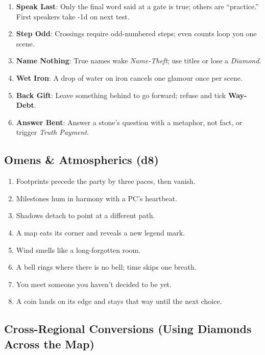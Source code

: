\begin{enumerate}
\item \textbf{Speak Last}: Only the final word said at a gate is true; others are “practice.” First speakers take -1d on next test.
\item \textbf{Step Odd}: Crossings require odd-numbered steps; even counts loop you one scene.
\item \textbf{Name Nothing}: True names wake \emph{Name-Theft}; use titles or lose a \emph{Diamond}.
\item \textbf{Wet Iron}: A drop of water on iron cancels one glamour once per scene.
\item \textbf{Back Gift}: Leave something behind to go forward; refuse and tick \textbf{Way-Debt}.
\item \textbf{Answer Bent}: Answer a stone’s question with a metaphor, not fact, or trigger \emph{Truth Payment}.
\end{enumerate}
\subsection*{Omens \& Atmospherics (d8)}

\begin{enumerate}
\item Footprints precede the party by three paces, then vanish. 
\item Milestones hum in harmony with a PC’s heartbeat.
\item Shadows detach to point at a different path.
\item A map eats its corner and reveals a new legend mark.
\item Wind smells like a long-forgotten room.
\item A bell rings where there is no bell; time skips one breath.
\item You meet someone you haven’t decided to be yet.
\item A coin lands on its edge and stays that way until the next choice.
\end{enumerate}
\subsection*{Cross-Regional Conversions (Using Diamonds Across the Map)}

